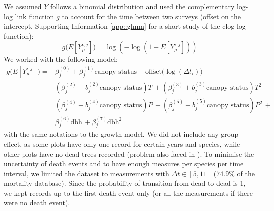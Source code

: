 We assumed $ Y $ follows a binomial distribution and used the complementary log-log link function $ g $ to account for the time between two surveys (offset on the intercept, Supporting Information \ref{app::glmm} for a short study of the clog-log function):
\[
	g \big(E[Y_\mu^{i, j}] \big) = \log \left( -\log(1 - E[Y_\mu^{i, j}]) \right)
\]
We worked with the following model:
\begin{equation}\label{eq::glmm_mortality}
\begin{split}
	g \big(E[Y_\mu^{i, j}] \big) = & \beta_{j}^{(0)}  + \beta_j^{(1)}  \text{canopy status} +
		\text{offset}\big(\log(\Delta t_i) \big) \, + \\
	& \left(\beta_j^{(2)} + b_j^{(2)} \text{canopy status} \right) T \, +
	\left(\beta_j^{(3)} + b_j^{(3)} \text{canopy status} \right) T^2 \, + \\
	& \left(\beta_j^{(4)} + b_j^{(4)} \text{canopy status} \right) P \, +
	\left(\beta_j^{(5)} + b_j^{(5)} \text{canopy status} \right) P^2 \, + \\
	& \beta_j^{(6)} \text{dbh} \, + \beta_j^{(7)} \text{dbh}^2
\end{split}
\end{equation}
with the same notations to the growth model. We did not include any group effect, as some plots have only one record for certain years and species, while other plots have no dead trees recorded (problem also faced in \citet{Kunstler2019}). To minimise the uncertainty of death events and to have enough measures per species per time interval, we limited the dataset to measurements with $ \Delta t \in [5, 11] $ ($ 74.9 \% $ of the mortality database). Since the probability of transition from dead to dead is 1, we kept records up to the first death event only (or all the measurements if there were no death event). \\

